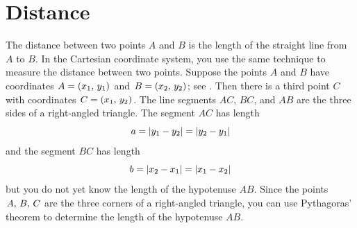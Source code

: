 \documentclass[a4paper,oneside,12pt]{article}
\begin{document}



\section{Distance}

The distance between two points $A$ and $B$ is the length of the
straight line from $A$ to $B$.  In the Cartesian coordinate system,
you use the same technique to measure the distance between two
points.  Suppose the points $A$ and $B$ have coordinates
$A = \left\lparen{x_1},\, {y_1}\right\rparen$ and $B = \left\lparen{x_2},\, {y_2}\right\rparen$; see
.  Then there is a third point
$C$ with coordinates $C = \left\lparen{x_1},\, {y_2}\right\rparen$.  The line segments $AC$,
$BC$, and $AB$ are the three sides of a right-angled triangle.  The
segment $AC$ has length
\[
a
=
\lvert y_1 - y_2\rvert
=
\lvert y_2 - y_1\rvert
\]
and the segment $BC$ has length
\[
b
=
\lvert x_2 - x_1\rvert
=
\lvert x_1 - x_2\rvert
\]
but you do not yet know the length of the hypotenuse $AB$.  Since the
points ${A},\, {B},\, {C}$ are the three corners of a right-angled
triangle, you can use Pythagoras' theorem to determine the length of
the hypotenuse $AB$.
\end{document}

